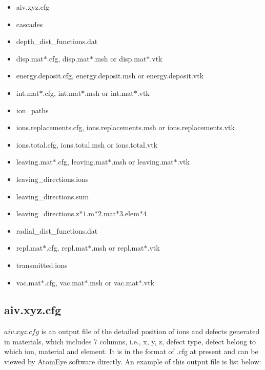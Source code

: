 \begin{itemize}

\item aiv.xyz.cfg

\item cascades

\item depth\_dist\_functions.dat

\item disp.mat$*$.cfg, disp.mat$*$.msh or disp.mat$*$.vtk

\item energy.deposit.cfg, energy.deposit.msh or energy.deposit.vtk

\item int.mat$*$.cfg, int.mat$*$.msh or int.mat$*$.vtk

\item ion\_paths

\item ions.replacements.cfg, ions.replacements.msh or ions.replacements.vtk

\item ions.total.cfg, ions.total.msh or ions.total.vtk

\item leaving.mat$*$.cfg, leaving.mat$*$.msh or leaving.mat$*$.vtk

\item leaving\_directions.ions

\item leaving\_directions.sum

\item leaving\_directions.z$*1$.m$*2$.mat$*3$.elem$*4$

\item radial\_dist\_functions.dat

\item repl.mat$*$.cfg, repl.mat$*$.msh or repl.mat$*$.vtk

\item transmitted.ions

\item vac.mat$*$.cfg, vac.mat$*$.msh or vac.mat$*$.vtk

\end{itemize}

\subsection{aiv.xyz.cfg}

$aiv.xyz.cfg$ is an output file of the detailed position of ions and defects generated in materials, which includes 7 columns, i.e., x, y, z, defect type, defect belong to which ion, material and element. It is in the format of .cfg at present and can be viewed by AtomEye software directly. An example of this output file is list below:

